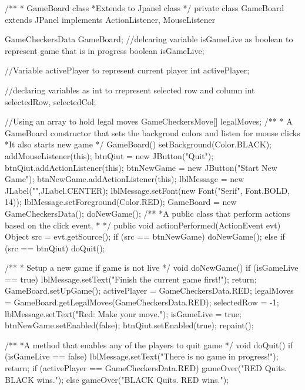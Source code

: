 \documentclass[10pt, a4paper]{article}
\begin{document}
{   /**
    * GameBoard class
	*Extends to Jpanel class
    */
   private class GameBoard extends JPanel implements ActionListener, MouseListener {
      GameCheckersData GameBoard;
	  //delcaring variable  isGameLive as boolean to represent game that is in progress
      boolean isGameLive;

     //Variable activePlayer to represent current player
      int activePlayer;

	  //declaring variables as int to rrepresent selected row and column
      int selectedRow, selectedCol;

	  //Using an array to hold legal moves
      GameCheckersMove[] legalMoves;
      /**
	  * A GameBoard constructor  that sets the backgroud colors and listen for mouse clicks
	  *It also starts new game
       */
      GameBoard() {
         setBackground(Color.BLACK);
         addMouseListener(this);
         btnQiut = new JButton("Quit");
         btnQiut.addActionListener(this);
         btnNewGame = new JButton("Start New Game");
         btnNewGame.addActionListener(this);
         lblMessage = new JLabel("",JLabel.CENTER);
         lblMessage.setFont(new  Font("Serif", Font.BOLD, 14));
         lblMessage.setForeground(Color.RED);
         GameBoard = new GameCheckersData();
         doNewGame();
      }
      /**
	  *A public class that perform actions based on the click event.
       *
       */
      public void actionPerformed(ActionEvent evt) {
         Object src = evt.getSource();
         if (src == btnNewGame)
            doNewGame();
         else if (src == btnQiut)
            doQuit();
      }

      /**
       * Setup a new game if game is not  live
       */
      void doNewGame() {
         if (isGameLive == true) {
            lblMessage.setText("Finish the current game first!");
            return;
         }
         GameBoard.setUpGame();
         activePlayer = GameCheckersData.RED;
         legalMoves = GameBoard.getLegalMoves(GameCheckersData.RED);
         selectedRow = -1;
         lblMessage.setText("Red:  Make your move.");
         isGameLive = true;
         btnNewGame.setEnabled(false);
         btnQiut.setEnabled(true);
         repaint();
      }

      /**
       *A method that enables any of the players to quit game
       */
      void doQuit() {
         if (isGameLive == false) {
            lblMessage.setText("There is no game in progress!");
            return;
         }
         if (activePlayer == GameCheckersData.RED)
            gameOver("RED Quits.  BLACK wins.");
         else
            gameOver("BLACK Quits.  RED wins.");
      }

}}
\end{document}

